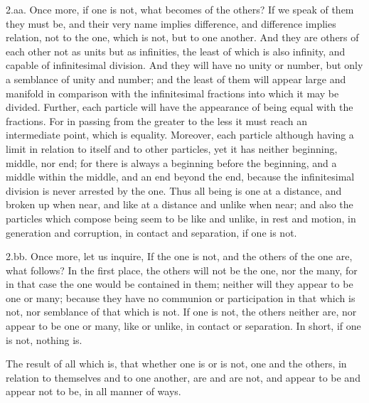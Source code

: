2.aa. Once more, if one is not, what becomes of the others? If we
speak of them they must be, and their very name implies difference, and
difference implies relation, not to the one, which is not, but to
one another. And they are others of each other not as units but
as infinities, the least of which is also infinity, and capable of
infinitesimal division. And they will have no unity or number, but only
a semblance of unity and number; and the least of them will appear large
and manifold in comparison with the infinitesimal fractions into which
it may be divided. Further, each particle will have the appearance of
being equal with the fractions. For in passing from the greater to the
less it must reach an intermediate point, which is equality. Moreover,
each particle although having a limit in relation to itself and to other
particles, yet it has neither beginning, middle, nor end; for there is
always a beginning before the beginning, and a middle within the middle,
and an end beyond the end, because the infinitesimal division is never
arrested by the one. Thus all being is one at a distance, and broken
up when near, and like at a distance and unlike when near; and also the
particles which compose being seem to be like and unlike, in rest and
motion, in generation and corruption, in contact and separation, if one
is not.

2.bb. Once more, let us inquire, If the one is not, and the others of
the one are, what follows? In the first place, the others will not be
the one, nor the many, for in that case the one would be contained in
them; neither will they appear to be one or many; because they have no
communion or participation in that which is not, nor semblance of that
which is not. If one is not, the others neither are, nor appear to be
one or many, like or unlike, in contact or separation. In short, if one
is not, nothing is.

The result of all which is, that whether one is or is not, one and the
others, in relation to themselves and to one another, are and are not,
and appear to be and appear not to be, in all manner of ways.

